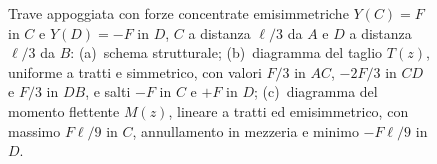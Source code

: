 \begin{figure}[htbp]
{
			}
			\caption{Trave appoggiata con forze concentrate emisimmetriche
				$Y(C) = F$ in $C$ e $Y(D) = -F$ in $D$, $C$ a distanza
				$\ell/3$ da $A$ e $D$ a distanza $\ell/3$ da $B$:
				(a)~schema strutturale;
				(b)~diagramma del taglio $T(z)$, uniforme a tratti e
				simmetrico, con valori $F/3$ in $AC$, $-2F/3$ in $CD$
				e $F/3$ in $DB$, e salti $-F$ in $C$ e $+F$ in $D$;
				(c)~diagramma del momento flettente $M(z)$, lineare a
				tratti ed emisimmetrico, con massimo $F\ell/9$ in $C$,
				annullamento in mezzeria e minimo $-F\ell/9$ in $D$.}
			\label{fig:stat_trasv_iso_00b}
		\end{figure}

